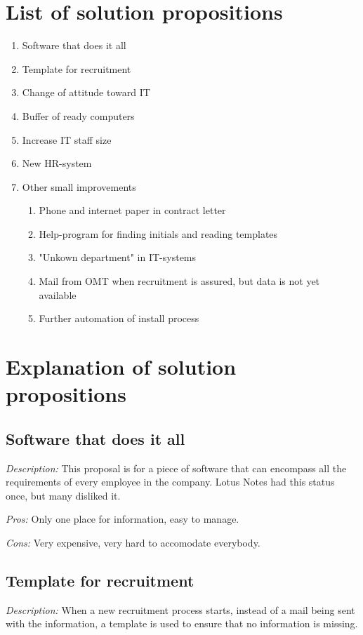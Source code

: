 \label{app:solution_propositions}
\section{List of solution propositions}
\begin{enumerate}
\item Software that does it all
\item Template for recruitment
\item Change of attitude toward IT
\item Buffer of ready computers
\item Increase IT staff size
\item New HR-system
\item Other small improvements
	\begin{enumerate}
	\item Phone and internet paper in contract letter
	\item Help-program for finding initials and reading templates
	\item "Unkown department" in IT-systems
	\item Mail from OMT when recruitment is assured, but data is not yet available
	\item Further automation of install process
	\end{enumerate}
\end{enumerate}

\section{Explanation of solution propositions}
\subsection{Software that does it all}
\emph{Description:} This proposal is for a piece of software that can encompass all the requirements of every employee in the company. Lotus Notes had this status once, but many disliked it.

\noindent \emph{Pros:} Only one place for information, easy to manage.

\noindent \emph{Cons:} Very expensive, very hard to accomodate everybody.

\subsection{Template for recruitment}
\emph{Description:} When a new recruitment process starts, instead of a mail being sent with the information, a template is used to ensure that no information is missing.

